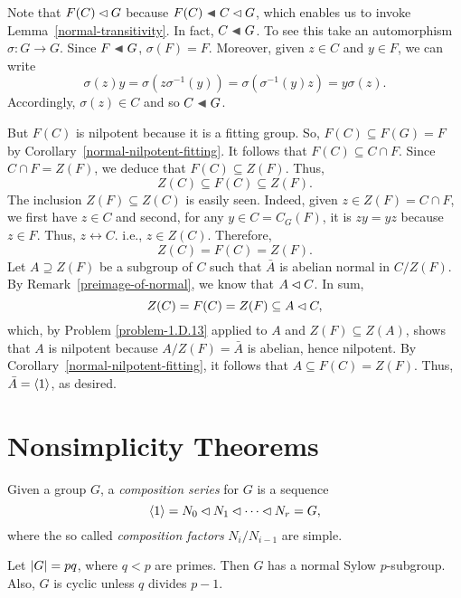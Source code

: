 \begin{solution} Note that $F(C)\lhd G$ because $F(C)\ch C\normal G$, which enables us to invoke Lemma~\ref{normal-transitivity}. In fact, $C\ch G$. To see this take an automorphism $\sigma\colon G\to G$. Since $F\ch G$, $\sigma(F)=F$. Moreover, given $z\in C$ and $y\in F$, we can write
$$
    \sigma(z)y=\sigma(z\sigma^{-1}(y))=\sigma(\sigma^{-1}(y)z)=y\sigma(z).
$$
Accordingly, $\sigma(z)\in C$ and so $C\ch G$.

But $F(C)$ is nilpotent because it is a fitting group. So, $F(C)\subseteq F(G)=F$ by Corollary~\ref{normal-nilpotent-fitting}. It follows that $F(C)\subseteq C\cap F$. Since $C\cap F=Z(F)$, we deduce that $F(C)\subseteq Z(F)$. Thus,
$$
    Z(C)\subseteq F(C)\subseteq Z(F).
$$
The inclusion $Z(F)\subseteq Z(C)$ is easily seen. Indeed, given $z\in Z(F)=C\cap F$, we first have $z\in C$ and second, for any $y\in C=C_G(F)$, it is $zy=yz$ because $z\in F$. Thus, $z\leftrightarrow C$. i.e., $z\in Z(C)$. Therefore,
$$
    Z(C)= F(C)=Z(F).
$$
Let $A \supseteq Z(F)$ be a subgroup of $C$ such that $\bar A$ is abelian normal in $C/Z(F)$. By Remark~\ref{preimage-of-normal}, we know that $A\lhd C$. In sum,
$$
    Z(C)= F(C) = Z(F)\subseteq A\lhd C,
$$
which, by Problem \ref{problem-1.D.13} applied to $A$ and $Z(F)\subseteq Z(A)$, shows that $A$ is nilpotent because $A/Z(F)=\bar A$ is abelian, hence nilpotent. By Corollary~\ref{normal-nilpotent-fitting}, it follows that $A\subseteq F(C)=Z(F)$. Thus, $\bar A=\langle1\rangle$, as desired.  \end{solution}

\section{Nonsimplicity Theorems}

\begin{defn}\label{composition-series}
    Given a group $G$, a \textsl{composition series} for $G$ is a sequence
    $$
        \langle1\rangle=N_0\lhd N_1\lhd\cdots\lhd N_r=G,
    $$
    where the so called \textsl{composition factors} $N_i/N_{i-1}$ are simple.
\end{defn}

\begin{thm}\label{thm-pq}
    Let $\left\vert{G}\right\vert=pq$, where $q<p$ are primes. Then $G$ has a normal Sylow $p$-subgroup. Also, $G$ is cyclic unless $q$ divides $p-1$.
\end{thm}

